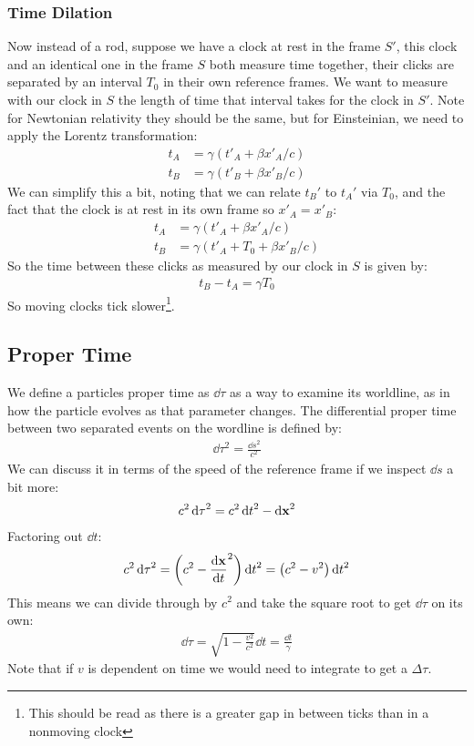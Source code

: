 \documentclass[12pt]{article}
\begin{document}
\subsubsection{Time Dilation}
Now instead of a rod, suppose we have a clock at rest in the frame $S'$, this clock and an identical one in the frame $S$ both measure time together, their clicks are separated by an interval $T_0$ in their own reference frames. We want to measure with our clock in $S$ the length of time that interval takes for the clock in $S'$. Note for Newtonian relativity they should be the same, but for Einsteinian, we need to apply the Lorentz transformation:
\begin{align*}
  t_A&=\gamma(t'_A+\beta x'_A/c)\\
  t_B&=\gamma(t'_B+\beta x'_B/c)
\end{align*}
We can simplify this a bit, noting that we can relate $t_B'$ to $t_A'$ via $T_0$, and the fact that the clock is at rest in its own frame so $x'_A=x'_B$:
\begin{align*}
  t_A&=\gamma(t'_A+\beta x'_A/c)\\
  t_B&=\gamma(t'_A+T_0+\beta x'_B/c)
\end{align*}
So the time between these clicks as measured by our clock in $S$ is given by:
\begin{align*}
  t_B-t_A=\gamma T_0
\end{align*}
So moving clocks tick slower\footnote{This should be read as there is a greater gap in between ticks than in a nonmoving clock}.
\subsection{Proper Time}
We define a particles proper time as $\dd{\tau}$ as a way to examine its worldline, as in how the particle evolves as that parameter changes. The differential proper time between two separated events on the wordline is defined by:
\begin{align*}
  \dd{\tau}^2=\frac{\dd{s}^2}{c^2}
\end{align*}
We can discuss it in terms of the speed of the reference frame if we inspect $\dd{s}$ a bit more:
\begin{align*}
  c^2\dd{\tau}^2=c^2\dd{t}^2-\dd{\vb{x}}^2
\end{align*}
Factoring out $\dd{t}$:
\begin{align*}
  c^2\dd{\tau}^2=\qty(c^2-\dv{\vb{x}}{t}^2)\dd{t}^2=\qty(c^2-v^2)\dd{t}^2
\end{align*}
This means we can divide through by $c^2$ and take the square root to get $\dd{\tau}$ on its own:
\begin{align*}
  \dd{\tau}=\sqrt{1-\frac{v^2}{c^2}}\dd{t}=\frac{\dd{t}}{\gamma}
\end{align*}
Note that if $v$ is dependent on time we would need to integrate to get a $\Delta\tau$.
\end{document}
